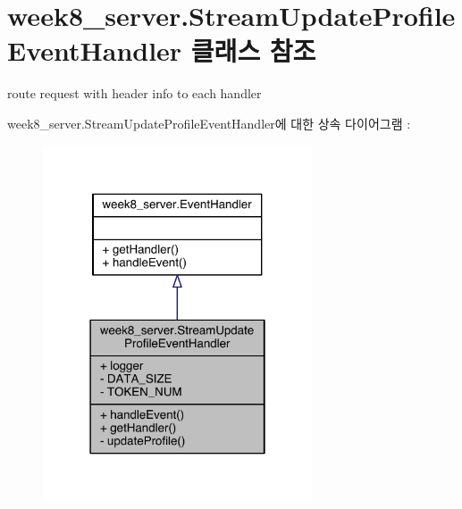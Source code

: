 \hypertarget{classweek8__server_1_1_stream_update_profile_event_handler}{\section{week8\-\_\-server.\-Stream\-Update\-Profile\-Event\-Handler 클래스 참조}
\label{classweek8__server_1_1_stream_update_profile_event_handler}
}


route request with header info to each handler  




week8\-\_\-server.\-Stream\-Update\-Profile\-Event\-Handler에 대한 상속 다이어그램 \-: 
\nopagebreak
\begin{figure}[H]
\begin{center}
\leavevmode
\includegraphics[width=226pt]{classweek8__server_1_1_stream_update_profile_event_handler__inherit__graph}
\end{center}
\end{figure}


